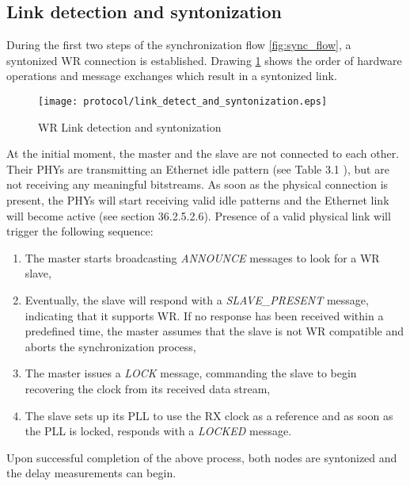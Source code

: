 \subsection{Link detection and syntonization}
During the first two steps of the synchronization flow
\ref{fig:sync_flow}, a syntonized WR connection is established. Drawing
\ref{fig:link_detect_and_syntonization} shows the order of hardware operations
and message exchanges which result in a syntonized link.
\begin{figure}[ht!]
  \centering
  \texttt{[image: protocol/link\_detect\_and\_syntonization.eps]}
  \caption{WR Link detection and syntonization}
  \label{fig:link_detect_and_syntonization}
\end{figure}
At the initial moment, the master and the slave are not connected to
each other. Their PHYs are transmitting an Ethernet idle pattern (see Table 3.1 \cite{tomekMSC}), 
but are not receiving any meaningful bitstreams. As soon
as the physical connection is present, the PHYs will start receiving valid
idle patterns and the Ethernet link will become active (see \cite{IEEE802.3}
section 36.2.5.2.6). Presence of a valid physical link will trigger the
following sequence:
\begin{enumerate}
\item The master starts broadcasting \textit{ANNOUNCE} messages to look for
a WR slave,
\item Eventually, the slave will respond with a \textit{SLAVE\_PRESENT}
message, indicating that it supports WR. If no response has been received
within a predefined time, the master assumes that the slave is not WR
compatible and aborts the synchronization process,
\item The master issues a \textit{LOCK} message, commanding the slave to
begin recovering the clock from its received data stream,
\item The slave sets up its PLL to use the RX clock as a reference and as
soon as the PLL is locked, responds with a \textit{LOCKED} message.
\end{enumerate}
Upon successful completion of the above process, both nodes are syntonized
and the delay measurements can begin.

